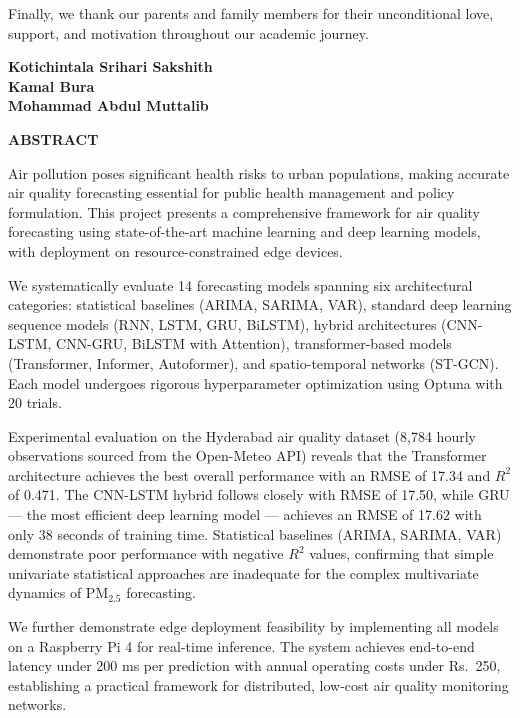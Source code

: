 \documentclass[12pt,a4paper]{report}
\newcommand{\studentA}{Kotichintala Srihari Sakshith}
\newcommand{\studentB}{Kamal Bura}
\newcommand{\studentC}{Mohammad Abdul Muttalib}
\begin{document}
\vspace{0.2in}
Finally, we thank our parents and family members for their unconditional love, support, and motivation throughout our academic journey.

\vspace{0.6in}
\begin{flushright}
    \textbf{\studentA} \\
    \textbf{\studentB} \\
    \textbf{\studentC}
\end{flushright}

\newpage\thispagestyle{empty}\singlespacing
\begin{center}{\Large \textbf{ABSTRACT}\par}\end{center}
\vspace{0.3in}
Air pollution poses significant health risks to urban populations, making accurate air quality forecasting essential for public health management and policy formulation. This project presents a comprehensive framework for air quality forecasting using state-of-the-art machine learning and deep learning models, with deployment on resource-constrained edge devices.

We systematically evaluate 14 forecasting models spanning six architectural categories: statistical baselines (ARIMA, SARIMA, VAR), standard deep learning sequence models (RNN, LSTM, GRU, BiLSTM), hybrid architectures (CNN-LSTM, CNN-GRU, BiLSTM with Attention), transformer-based models (Transformer, Informer, Autoformer), and spatio-temporal networks (ST-GCN). Each model undergoes rigorous hyperparameter optimization using Optuna with 20 trials.

Experimental evaluation on the Hyderabad air quality dataset (8,784 hourly observations sourced from the Open-Meteo API) reveals that the Transformer architecture achieves the best overall performance with an RMSE of 17.34 and $R^2$ of 0.471. The CNN-LSTM hybrid follows closely with RMSE of 17.50, while GRU --- the most efficient deep learning model --- achieves an RMSE of 17.62 with only 38 seconds of training time. Statistical baselines (ARIMA, SARIMA, VAR) demonstrate poor performance with negative $R^2$ values, confirming that simple univariate statistical approaches are inadequate for the complex multivariate dynamics of PM$_{2.5}$ forecasting.

We further demonstrate edge deployment feasibility by implementing all models on a Raspberry Pi 4 for real-time inference. The system achieves end-to-end latency under 200 ms per prediction with annual operating costs under Rs.~250, establishing a practical framework for distributed, low-cost air quality monitoring networks.
\end{document}
